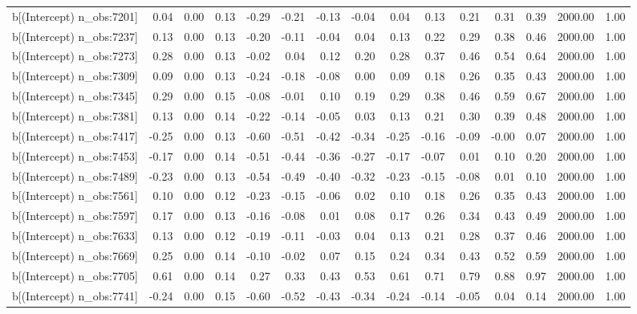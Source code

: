 \begin{table}[ht]
\begin{tabular}{rrrrrrrrrrrrrrr}
  b[(Intercept) n\_obs:7201] & 0.04 & 0.00 & 0.13 & -0.29 & -0.21 & -0.13 & -0.04 & 0.04 & 0.13 & 0.21 & 0.31 & 0.39 & 2000.00 & 1.00 \\ 
  b[(Intercept) n\_obs:7237] & 0.13 & 0.00 & 0.13 & -0.20 & -0.11 & -0.04 & 0.04 & 0.13 & 0.22 & 0.29 & 0.38 & 0.46 & 2000.00 & 1.00 \\ 
  b[(Intercept) n\_obs:7273] & 0.28 & 0.00 & 0.13 & -0.02 & 0.04 & 0.12 & 0.20 & 0.28 & 0.37 & 0.46 & 0.54 & 0.64 & 2000.00 & 1.00 \\ 
  b[(Intercept) n\_obs:7309] & 0.09 & 0.00 & 0.13 & -0.24 & -0.18 & -0.08 & 0.00 & 0.09 & 0.18 & 0.26 & 0.35 & 0.43 & 2000.00 & 1.00 \\ 
  b[(Intercept) n\_obs:7345] & 0.29 & 0.00 & 0.15 & -0.08 & -0.01 & 0.10 & 0.19 & 0.29 & 0.38 & 0.46 & 0.59 & 0.67 & 2000.00 & 1.00 \\ 
  b[(Intercept) n\_obs:7381] & 0.13 & 0.00 & 0.14 & -0.22 & -0.14 & -0.05 & 0.03 & 0.13 & 0.21 & 0.30 & 0.39 & 0.48 & 2000.00 & 1.00 \\ 
  b[(Intercept) n\_obs:7417] & -0.25 & 0.00 & 0.13 & -0.60 & -0.51 & -0.42 & -0.34 & -0.25 & -0.16 & -0.09 & -0.00 & 0.07 & 2000.00 & 1.00 \\ 
  b[(Intercept) n\_obs:7453] & -0.17 & 0.00 & 0.14 & -0.51 & -0.44 & -0.36 & -0.27 & -0.17 & -0.07 & 0.01 & 0.10 & 0.20 & 2000.00 & 1.00 \\ 
  b[(Intercept) n\_obs:7489] & -0.23 & 0.00 & 0.13 & -0.54 & -0.49 & -0.40 & -0.32 & -0.23 & -0.15 & -0.08 & 0.01 & 0.10 & 2000.00 & 1.00 \\ 
  b[(Intercept) n\_obs:7561] & 0.10 & 0.00 & 0.12 & -0.23 & -0.15 & -0.06 & 0.02 & 0.10 & 0.18 & 0.26 & 0.35 & 0.43 & 2000.00 & 1.00 \\ 
  b[(Intercept) n\_obs:7597] & 0.17 & 0.00 & 0.13 & -0.16 & -0.08 & 0.01 & 0.08 & 0.17 & 0.26 & 0.34 & 0.43 & 0.49 & 2000.00 & 1.00 \\ 
  b[(Intercept) n\_obs:7633] & 0.13 & 0.00 & 0.12 & -0.19 & -0.11 & -0.03 & 0.04 & 0.13 & 0.21 & 0.28 & 0.37 & 0.46 & 2000.00 & 1.00 \\ 
  b[(Intercept) n\_obs:7669] & 0.25 & 0.00 & 0.14 & -0.10 & -0.02 & 0.07 & 0.15 & 0.24 & 0.34 & 0.43 & 0.52 & 0.59 & 2000.00 & 1.00 \\ 
  b[(Intercept) n\_obs:7705] & 0.61 & 0.00 & 0.14 & 0.27 & 0.33 & 0.43 & 0.53 & 0.61 & 0.71 & 0.79 & 0.88 & 0.97 & 2000.00 & 1.00 \\ 
  b[(Intercept) n\_obs:7741] & -0.24 & 0.00 & 0.15 & -0.60 & -0.52 & -0.43 & -0.34 & -0.24 & -0.14 & -0.05 & 0.04 & 0.14 & 2000.00 & 1.00 \\ 

\end{tabular}
\end{table}

